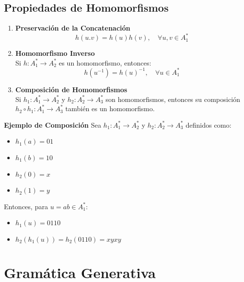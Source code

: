 \documentclass[12pt]{report} %
\begin{document}
\hypertarget{propiedades-de-homomorfismos}{%
\subsection{Propiedades de
Homomorfismos}\label{propiedades-de-homomorfismos}}

\begin{enumerate}
\def\labelenumi{\arabic{enumi}.}
\item
  \textbf{Preservación de la Concatenación}\\
  \[
   h(u.v) = h(u)h(v), \quad \forall u, v \in A_1^*
   \]
\item
  \textbf{Homomorfismo Inverso}\\
  Si \(h : A_1^* \to A_2^*\) es un homomorfismo, entonces: \[
   h(u^{-1}) = h(u)^{-1}, \quad \forall u \in A_1^*
   \]
\item
  \textbf{Composición de Homomorfismos}\\
  Si \(h_1 : A_1^* \to A_2^*\) y \(h_2 : A_2^* \to A_3^*\) son
  homomorfismos, entonces su composición
  \(h_2 \circ h_1 : A_1^* \to A_3^*\) también es un homomorfismo.
\end{enumerate}

\begin{ejemplo}
    \textbf{Ejemplo de Composición}  
    Sea $h_1 : A_1^* \to A_2^*$ y $h_2 : A_2^* \to A_3^*$ definidos como:

    \begin{itemize}
        \item $h_1(a) = 01$
        \item $h_1(b) = 10$
        \item $h_2(0) = x$
        \item $h_2(1) = y$
    \end{itemize}

    Entonces, para $u = ab \in A_1^*$:

    \begin{itemize}
        \item $h_1(u) = 0110$
        \item $h_2(h_1(u)) = h_2(0110) = xyxy$
    \end{itemize}
\end{ejemplo}

\hypertarget{gramuxe1tica-generativa}{%
\section{Gramática Generativa}\label{gramuxe1tica-generativa}}
\end{document}

